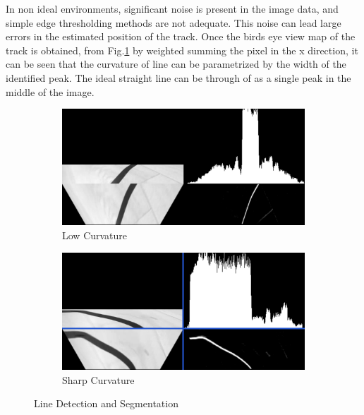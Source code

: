         In non ideal environments, significant noise is present in the image data, 
        and simple edge thresholding methods are not adequate. This noise can lead large errors
        in the estimated position of the track. Once the birds eye view map of the track is obtained, 
        from Fig.\ref{fig:LineDetection} by weighted summing the pixel in the x direction, it can be seen that the 
        curvature of line can be parametrized by the width of the identified peak. The ideal straight line can be through of as
        a single peak in the middle of the image.  

        \begin{figure}[H]
            \centering
            \begin{subfigure}[b]{0.45\textwidth}
                \includegraphics[width=\textwidth]{vizSmallCurve.png}
                \caption{Low Curvature}
                \label{fig:LineDetection}
            \end{subfigure}
            \hfill
            \begin{subfigure}[b]{0.45\textwidth}
                \includegraphics[width=\textwidth]{vizBigCurve.png}
                \caption{Sharp Curvature}
                \label{fig:Sharp Curvature}
            \end{subfigure}
            \caption{Line Detection and Segmentation}   
        \end{figure}

